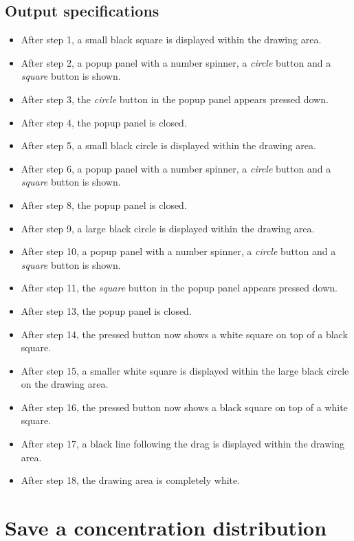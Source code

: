 \subsection*{Output specifications}
\begin{itemize}
\item After step 1, a small black square is displayed within the drawing area.
\item After step 2, a popup panel with a number spinner, a \emph{circle} button and a \emph{square} button is shown.
\item After step 3, the \emph{circle} button in the popup panel appears pressed down.
\item After step 4, the popup panel is closed.
\item After step 5, a small black circle is displayed within the drawing area.

\item After step 6, a popup panel with a number spinner, a \emph{circle} button and a \emph{square} button is shown.
\item After step 8, the popup panel is closed.
\item After step 9, a large black circle is displayed within the drawing area.
\item After step 10, a popup panel with a number spinner, a \emph{circle} button and a \emph{square} button is shown.

\item After step 11, the \emph{square} button in the popup panel appears pressed down.
\item After step 13, the popup panel is closed.
\item After step 14, the pressed button now shows a white square on top of a black square.
\item After step 15, a smaller white square is displayed within the large black circle on the drawing area.

\item After step 16, the pressed button now shows a black square on top of a white square.
\item After step 17, a black line following the drag is displayed within the drawing area.
\item After step 18, the drawing area is completely white.
\end{itemize}

\section{Save a concentration distribution}

